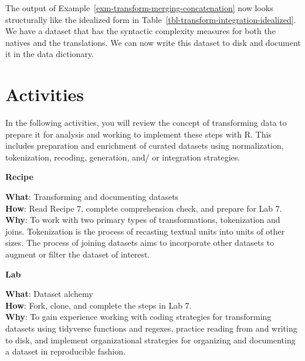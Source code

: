 \documentclass[
  letterpaper,
  krantz1]{latex/krantz-mod}
\theoremstyle{definition}
\theoremstyle{definition}
\theoremstyle{remark}
\begin{document}
The output of Example~\ref{exm-transform-merging-concatenation} now
looks structurally like the idealized form in
Table~\ref{tbl-transform-integration-idealized}. We have a dataset that
has the syntactic complexity measures for both the natives and the
translations. We can now write this dataset to disk and document it in
the data dictionary.

\section*{Activities}\label{activities-5}


In the following activities, you will review the concept of transforming
data to prepare it for analysis and working to implement these steps
with R. This includes preparation and enrichment of curated datasets
using normalization, tokenization, recoding, generation, and/ or
integration strategies.

\begin{tcolorbox}[enhanced jigsaw, toprule=.15mm, breakable, colback=white, arc=.35mm, left=2mm, colframe=quarto-callout-color-frame, opacityback=0, bottomrule=.15mm, rightrule=.15mm, leftrule=.75mm]

\textbf{ Recipe}

\textbf{What}: Transforming and documenting datasets\\
\textbf{How}: Read Recipe 7, complete comprehension check, and prepare
for Lab 7.\\
\textbf{Why}: To work with two primary types of transformations,
tokenization and joins. Tokenization is the process of recasting textual
units into units of other sizes. The process of joining datasets aims to
incorporate other datasets to augment or filter the dataset of interest.

\end{tcolorbox}

\pagebreak

\begin{tcolorbox}[enhanced jigsaw, toprule=.15mm, breakable, colback=white, arc=.35mm, left=2mm, colframe=quarto-callout-color-frame, opacityback=0, bottomrule=.15mm, rightrule=.15mm, leftrule=.75mm]

\textbf{ Lab}

\textbf{What}: Dataset alchemy\\
\textbf{How}: Fork, clone, and complete the steps in Lab 7.\\
\textbf{Why}: To gain experience working with coding strategies for
transforming datasets using tidyverse functions and regexes, practice
reading from and writing to disk, and implement organizational
strategies for organizing and documenting a dataset in reproducible
fashion.

\end{tcolorbox}
\end{document}
